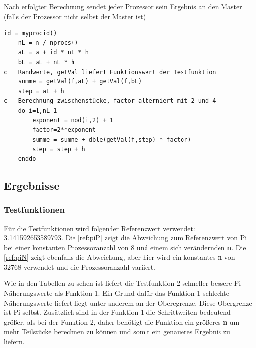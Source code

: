 Nach erfolgter Berechnung sendet jeder Prozessor sein Ergebnis an den Master (falls der Prozessor nicht selbst der Master ist)

\begin{lstlisting}[caption=Berechnen der relevanten Bereiche für jeden Prozessor\label{ref:intervall}]
	id = myprocid() 
	nL = n / nprocs()
	aL = a + id * nL * h
	bL = aL + nL * h
c	Randwerte, getVal liefert Funktionswert der Testfunktion
	summe = getVal(f,aL) + getVal(f,bL)   
	step = aL + h
c 	Berechnung zwischenstücke, factor alterniert mit 2 und 4
	do i=1,nL-1
		exponent = mod(i,2) + 1
		factor=2**exponent
		summe = summe + dble(getVal(f,step) * factor)
		step = step + h    
	enddo
\end{lstlisting}

\subsection{Ergebnisse}
\label{ref:ergebnisse}

\subsubsection{Testfunktionen}

Für die Testfunktionen wird folgender Referenzwert verwendet: 3.141592653589793.
Die \autoref{ref:piP} zeigt die Abweichung zum Referenzwert von Pi bei einer konstanten Prozessoranzahl von 8 und einem sich verändernden \textbf{n}.
Die \autoref{ref:piN} zeigt ebenfalls die Abweichung, aber hier wird ein konstantes \textbf{n} von 32768 verwendet und die Prozessoranzahl variiert.

Wie in den Tabellen zu sehen ist liefert die Testfunktion 2 schneller bessere Pi-Näherungswerte als Funktion 1.
Ein Grund dafür das Funktion 1 schlechte Näherungswerte liefert liegt unter anderem an der Oberegrenze.
Diese Obergrenze ist Pi selbst.
Zusätzlich sind in der Funktion 1 die Schrittweiten bedeutend größer, als bei der Funktion 2, daher benötigt die Funktion ein größeres \textbf{n} um mehr Teilstücke berechnen zu können und somit ein genaueres Ergebnis zu liefern.


